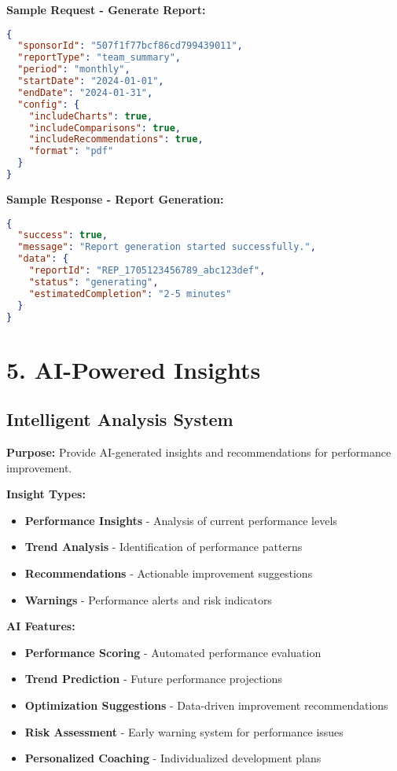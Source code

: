 \documentclass[12pt,a4paper]{article}
\newcommand{\samplecode}[1]{\begin{lstlisting}[language=JSON]#1\end{lstlisting}}
\begin{document}
\textbf{Sample Request - Generate Report:}
\samplecode{
{
  "sponsorId": "507f1f77bcf86cd799439011",
  "reportType": "team_summary",
  "period": "monthly",
  "startDate": "2024-01-01",
  "endDate": "2024-01-31",
  "config": {
    "includeCharts": true,
    "includeComparisons": true,
    "includeRecommendations": true,
    "format": "pdf"
  }
}
}

\textbf{Sample Response - Report Generation:}
\samplecode{
{
  "success": true,
  "message": "Report generation started successfully.",
  "data": {
    "reportId": "REP_1705123456789_abc123def",
    "status": "generating",
    "estimatedCompletion": "2-5 minutes"
  }
}
}

\section{5. AI-Powered Insights}

\subsection{Intelligent Analysis System}
\textbf{Purpose:} Provide AI-generated insights and recommendations for performance improvement.

\textbf{Insight Types:}
\begin{itemize}
    \item \textbf{Performance Insights} - Analysis of current performance levels
    \item \textbf{Trend Analysis} - Identification of performance patterns
    \item \textbf{Recommendations} - Actionable improvement suggestions
    \item \textbf{Warnings} - Performance alerts and risk indicators
\end{itemize}

\textbf{AI Features:}
\begin{itemize}
    \item \textbf{Performance Scoring} - Automated performance evaluation
    \item \textbf{Trend Prediction} - Future performance projections
    \item \textbf{Optimization Suggestions} - Data-driven improvement recommendations
    \item \textbf{Risk Assessment} - Early warning system for performance issues
    \item \textbf{Personalized Coaching} - Individualized development plans
\end{itemize}
\end{document}
